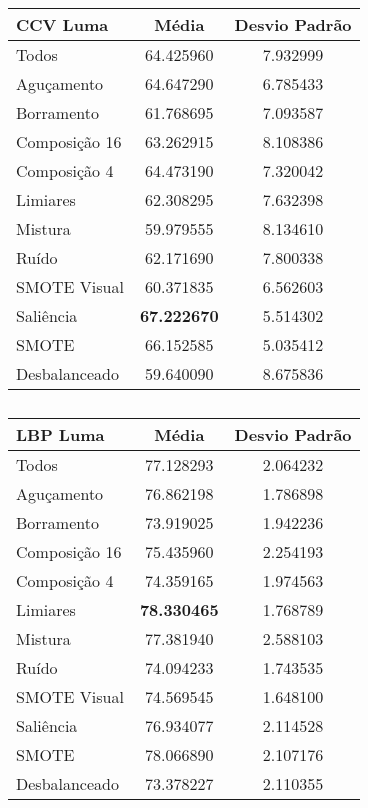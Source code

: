 
\begin{table}[!htbp]
\centering
\caption{}
\label{tab:resultados:x:melhor}
\begin{tabular}{|l|c|c|}
\hline
\textbf{CCV Luma} & \textbf{Média}     & \textbf{Desvio Padrão} \\ \hline
   Todos        &  64.425960 &  7.932999  \\ \hline
  Aguçamento    &  64.647290 &  6.785433  \\ \hline
  Borramento    &  61.768695 &  7.093587  \\ \hline
  Composição 16 &  63.262915 &  8.108386  \\ \hline
  Composição 4  &  64.473190 &  7.320042  \\ \hline
  Limiares      &  62.308295 &  7.632398  \\ \hline
  Mistura       &  59.979555 &  8.134610  \\ \hline
  Ruído         &  62.171690 &  7.800338  \\ \hline
  SMOTE Visual  &  60.371835 &  6.562603  \\ \hline
  Saliência     &  \textbf{67.222670} &  5.514302  \\ \hline
 SMOTE          &  66.152585 &  5.035412  \\ \hline
Desbalanceado   &  59.640090 &  8.675836  \\ \hline
\end{tabular}
\end{table}



\begin{table}[!htbp]
\centering
\caption{}
\label{tab:resultados:x:melhor}
\begin{tabular}{|l|c|c|}
\hline
\textbf{LBP Luma} & \textbf{Média}     & \textbf{Desvio Padrão} \\ \hline
   Todos        &  77.128293 &  2.064232  \\ \hline
  Aguçamento    &  76.862198 &  1.786898  \\ \hline
  Borramento    &  73.919025 &  1.942236  \\ \hline
  Composição 16 &  75.435960 &  2.254193  \\ \hline
  Composição 4  &  74.359165 &  1.974563  \\ \hline
  Limiares      &  \textbf{78.330465} &  1.768789  \\ \hline
  Mistura       &  77.381940 &  2.588103  \\ \hline
  Ruído         &  74.094233 &  1.743535  \\ \hline
  SMOTE Visual  &  74.569545 &  1.648100  \\ \hline
  Saliência     &  76.934077 &  2.114528  \\ \hline
 SMOTE          &  78.066890 &  2.107176  \\ \hline
Desbalanceado   &  73.378227 &  2.110355  \\ \hline
\end{tabular}
\end{table}

